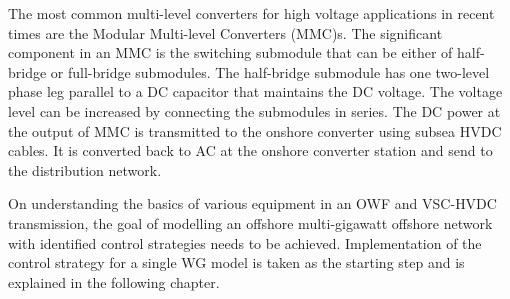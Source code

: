 The most common multi-level converters for high voltage applications in recent times are the Modular Multi-level Converters (\gls{MMC})s. The significant component in an \gls{MMC} is the switching submodule that can be either of half-bridge or full-bridge submodules. The half-bridge submodule has one two-level phase leg parallel to a \gls{DC} capacitor that maintains the \gls{DC} voltage. The voltage level can be increased by connecting the submodules in series. The \gls{DC} power at the output of \gls{MMC} is transmitted to the onshore converter using subsea \gls{HVDC} cables. It is converted back to \gls{AC} at the onshore converter station and send to the distribution network.

On understanding the basics of various equipment in an \gls{OWF} and \gls{VSC}-\gls{HVDC} transmission, the goal of modelling an offshore multi-gigawatt offshore network with identified control strategies needs to be achieved. Implementation of the control strategy for a single \gls{WG} model is taken as the starting step and is explained in the following chapter. 
